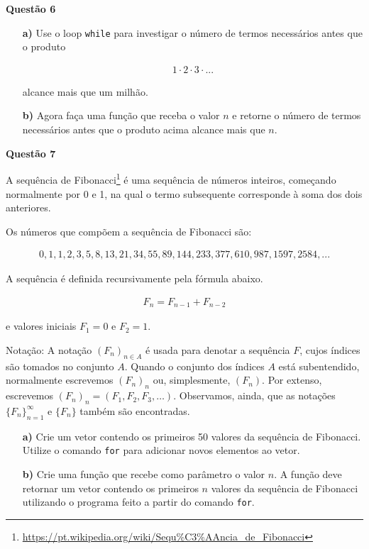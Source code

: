 \documentclass[12pt, a4paper]{article}
\begin{document}
\textbf{Questão 6}

\begin{itemize}
	\item[\textbf{a)}] Use o loop \texttt{while} para investigar o número de termos necessários antes que o produto
	
		\begin{align*}
			1\cdot 2\cdot 3\cdot ...
		\end{align*}
	
	alcance mais que um milhão. 
	
	\item[\textbf{b)}] Agora faça uma função que receba o valor $n$ e retorne o número de termos necessários antes que o produto acima alcance mais que $n$.
\end{itemize}
		


\textbf{Questão 7}

A sequência de Fibonacci\footnote{\url{https://pt.wikipedia.org/wiki/Sequ\%C3\%AAncia\_de\_Fibonacci}} é uma sequência de números inteiros, começando normalmente por 0 e 1, na qual o termo subsequente corresponde à soma dos dois anteriores.

Os números que compõem a sequência de Fibonacci são:

\begin{align*}
	0,1, 1, 2, 3, 5, 8, 13, 21, 34, 55, 89, 144, 233, 377, 610, 987, 1597, 2584, ...
\end{align*}

A sequência é definida recursivamente pela fórmula abaixo.

\begin{align*}
	F_n = F_{n-1} + F_{n-2}
\end{align*}

e valores iniciais $F_1 = 0$ e $F_2 = 1$.

Notação: A notação $(F_n)_{n\in A}$ é usada para denotar a sequência $F$, cujos índices são tomados no conjunto $A$. Quando o conjunto dos índices $A$ está subentendido, normalmente escrevemos $(F_{n})_{{n}}$ ou, simplesmente, $(F_{n})$. Por extenso, escrevemos $(F_{n})_{n}=(F_{1},F_{2},F_{3},\ldots )$. Observamos, ainda, que as notações $\{F_{n}\}_{{n=1}}^{{\infty }}$ e $\{F_{n}\}$ também são encontradas.



\begin{itemize}
	\item[\textbf{a)}] Crie um vetor contendo os primeiros 50 valores da sequência de Fibonacci. Utilize o comando \texttt{for} para adicionar novos elementos ao vetor.
	
	\item[\textbf{b)}] Crie uma função que recebe como parâmetro o valor $n$. A função deve retornar um vetor contendo os primeiros $n$ valores da sequência de Fibonacci utilizando o programa feito a partir do comando \texttt{for}.
\end{itemize}
\end{document}
